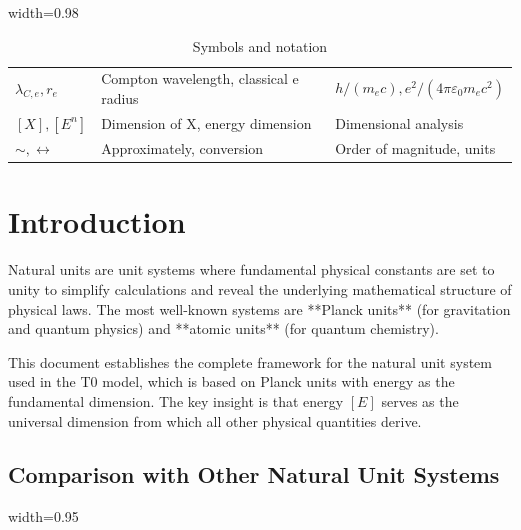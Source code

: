 {\begin{table}[htbp]
\begin{adjustbox}{width=0.98\textwidth}
\begin{tabular}{lll}
					$\lambda_{C,e}, r_e$ & Compton wavelength, classical e radius & $h/(m_e c), e^2/(4\pi\varepsilon_0 m_e c^2)$ \\
					$[X], [E^n]$ & Dimension of X, energy dimension & Dimensional analysis \\
					$\sim, \leftrightarrow$ & Approximately, conversion & Order of magnitude, units \\
					\bottomrule
				\end{tabular}
			\end{adjustbox}
			\caption{Symbols and notation}
			\label{tab:symbols}
		\end{table}
	}

	\section{Introduction}
	
	Natural units are unit systems where fundamental physical constants are set to unity to simplify calculations and reveal the underlying mathematical structure of physical laws. The most well-known systems are **Planck units** (for gravitation and quantum physics) and **atomic units** (for quantum chemistry).
	
	This document establishes the complete framework for the natural unit system used in the T0 model, which is based on Planck units with energy as the fundamental dimension. The key insight is that energy $[E]$ serves as the universal dimension from which all other physical quantities derive.
	
	\subsection{Comparison with Other Natural Unit Systems}
	
	\begin{table}[htbp]
		\centering
		\begin{adjustbox}{width=0.95\textwidth}
		\end{adjustbox}
		\caption{Comparison of natural unit systems}
		\label{tab:unit_systems}
	\end{table}
	
